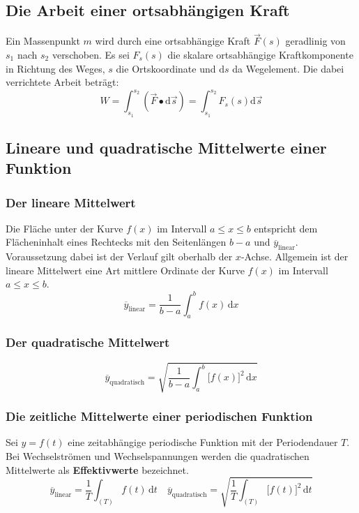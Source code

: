 \subsection{Die Arbeit einer ortsabhängigen Kraft}
Ein Massenpunkt $m$ wird durch eine ortsabhängige Kraft $\overrightarrow{F}\left(s\right)$ geradlinig von $s_1$ nach $s_2$ verschoben. Es sei $F_s\left(s\right)$ die skalare ortsabhängige Kraftkomponente in Richtung des Weges, $s$ die Ortskoordinate und $\text{d}s$ da Wegelement. Die dabei verrichtete Arbeit beträgt:
\begin{equation}
\boxed{W=\displaystyle \int_{s_1}^{s_2}\left(\overrightarrow{F}\bullet \text{d}\overrightarrow{s}\right)=\displaystyle \int_{s_1}^{s_2}F_s\left(s\right)\text{d}\overrightarrow{s}}
\end{equation}
\subsection{Lineare und quadratische Mittelwerte einer Funktion}
\subsubsection{Der lineare Mittelwert}
Die Fläche unter der Kurve $f\left(x\right)$ im Intervall $a\leq x\leq b$ entspricht dem Flächeninhalt eines Rechtecks mit den Seitenlängen $b-a$ und $\overline{y}_{\text{linear}}$. Voraussetzung dabei ist der Verlauf gilt oberhalb der $x$-Achse. Allgemein ist der lineare Mittelwert eine Art mittlere Ordinate der Kurve $f\left(x\right)$ im Intervall $a\leq x\leq b$.
\begin{equation}
\boxed{\overline{y}_{\text{linear}}=\dfrac{1}{b-a}\displaystyle \int_a^bf\left(x\right)\,\text{d}x}
\end{equation}
\subsubsection{Der quadratische Mittelwert}
\begin{equation}
\boxed{\overline{y}_{\text{quadratisch}}=\sqrt{\dfrac{1}{b-a}\displaystyle \int_a^b\Big[f\left(x\right)\Big]^2\,\text{d}x}}
\end{equation}
\subsubsection{Die zeitliche Mittelwerte einer periodischen Funktion}
Sei $y=f\left(t\right)$ eine zeitabhängige periodische Funktion mit der Periodendauer $T$. Bei Wechselströmen und Wechselspannungen werden die quadratischen Mittelwerte als \textbf{Effektivwerte} bezeichnet.
\begin{equation} 
\boxed{\overline{y}_{\text{linear}}=\dfrac{1}{T}\displaystyle \int_{\left(T\right)}f\left(t\right)\,\text{d}t}\quad \boxed{\overline{y}_{\text{quadratisch}}=\sqrt{\dfrac{1}{T}\displaystyle \int_{\left(T\right)}\Big[f\left(t\right)\Big]^2\,\text{d}t}}
\end{equation} 
